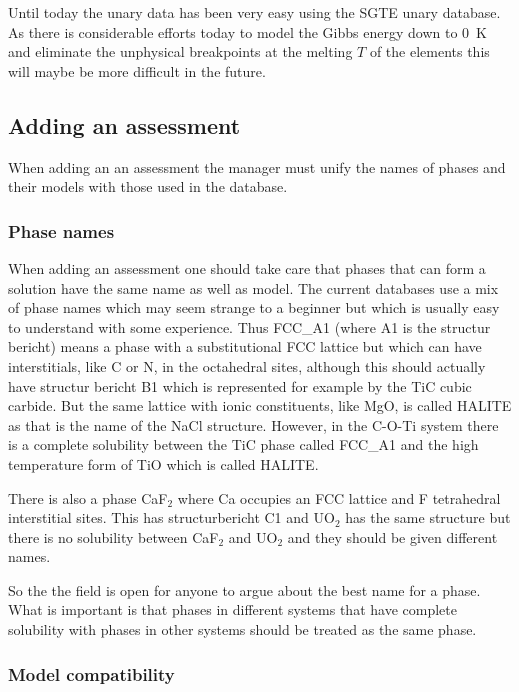 \documentclass[12pt]{article}
\begin{document}
Until today the unary data has been very easy using the SGTE unary
database\cite{91Din}.  As there is considerable efforts today to model
the Gibbs energy down to 0~K and eliminate the unphysical breakpoints
at the melting $T$ of the elements this will maybe be more difficult
in the future.

\subsection{Adding an assessment}

When adding an an assessment the manager must unify the names of
phases and their models with those used in the database.

\subsubsection{Phase names}

When adding an assessment one should take care that phases that can
form a solution have the same name as well as model.  The current
databases use a mix of phase names which may seem strange to a
beginner but which is usually easy to understand with some experience.
Thus FCC\_A1 (where A1 is the structur bericht) means a phase with a
substitutional FCC lattice but which can have interstitials, like C or
N, in the octahedral sites, although this should actually have
structur bericht B1 which is represented for example by the TiC cubic
carbide.  But the same lattice with ionic constituents, like MgO, is
called HALITE as that is the name of the NaCl structure.  However, in
the C-O-Ti system there is a complete solubility between the TiC phase
called FCC\_A1 and the high temperature form of TiO which is called
HALITE.

There is also a phase CaF$_2$ where Ca occupies an FCC lattice and F
tetrahedral interstitial sites.  This has structurbericht C1 and
UO$_2$ has the same structure but there is no solubility between
CaF$_2$ and UO$_2$ and they should be given different names.

So the the field is open for anyone to argue about the best name for a
phase.  What is important is that phases in different systems that
have complete solubility with phases in other systems should be
treated as the same phase.

\subsubsection{Model compatibility}
\end{document}
